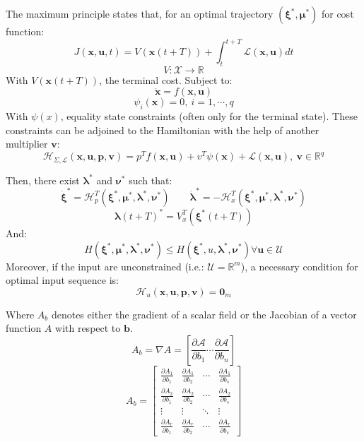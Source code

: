 \documentclass[a4paper, 12pt]{report}
\begin{document}
The maximum principle states that, for an optimal trajectory $(\boldsymbol{\xi}^*, \boldsymbol{\mu}^*)$ for cost function:
\[ J(\boldsymbol{x}, \boldsymbol{u}, t) = V(\boldsymbol{x}(t+T))  + \int_t^{t+T} \mathcal{L}(\boldsymbol{x}, \boldsymbol{u})dt\]
\[ V: \mathcal{X} \rightarrow \mathbb{R} \]
With $ V(\boldsymbol{x}(t+T))$, the terminal cost. Subject to:
\[ \boldsymbol{\dot x} = f(\boldsymbol{x}, \boldsymbol{u}) \]
\[ \psi_i(\boldsymbol{x}) = 0,\ i = 1, \cdots, q \]
With $\psi(x)$, equality state constraints (often only for the terminal state). These constraints can be adjoined to the Hamiltonian with the help of another multiplier $\boldsymbol{v}$:
\[ \mathcal{H}_{\Sigma,\mathcal{L}}(\boldsymbol{x}, \boldsymbol{u}, \boldsymbol{p}, \boldsymbol{v}) = p^T f(\boldsymbol{x}, \boldsymbol{u}) + v^T\psi(\boldsymbol{x}) + \mathcal{L}(\boldsymbol{x}, \boldsymbol{u}),\ \boldsymbol{v} \in \mathbb{R}^q \]

Then, there exist $\boldsymbol{\lambda}^*$ and $\boldsymbol{\nu}^*$ such that:
\[ \boldsymbol{\dot \xi}^* = \mathcal{H}_p^T (\boldsymbol{\xi}^*, \boldsymbol{\mu}^*, \boldsymbol{\lambda}^*, \boldsymbol{\nu}^*)  \qquad \boldsymbol{\dot \lambda}^*  = -\mathcal{H}_x^T (\boldsymbol{\xi}^*, \boldsymbol{\mu}^*, \boldsymbol{\lambda}^*, \boldsymbol{\nu}^*)\]
\[ \boldsymbol{\lambda}(t+T)^* = V_x^T(\boldsymbol{\xi}^*(t+T)) \]
And:
\[ H(\boldsymbol{\xi}^*, \boldsymbol{\mu}^*, \boldsymbol{\lambda}^*, \boldsymbol{\nu}^*) \leq H(\boldsymbol{\xi}^*, u, \boldsymbol{\lambda}^*, \boldsymbol{\nu}^*) \forall \boldsymbol{u} \in \mathcal{U} \]
Moreover, if the input are unconstrained (i.e.: $\mathcal{U}=\mathbb{R}^m$), a necessary condition for optimal input sequence is:
\[ \mathcal{H}_u (\boldsymbol{x}, \boldsymbol{u}, \boldsymbol{p}, \boldsymbol{v}) = \boldsymbol{0}_m \]

Where $A_b$ denotes either the gradient of a scalar field or the Jacobian of a vector function $A$ with respect to $\boldsymbol{b}$.
\[ A_b = \nabla A = \left [ \frac{\partial \mathcal{A}}{\partial b_1} \cdots \frac{\partial \mathcal{A}}{\partial b_n} \right ] \]
\[ A_b =  \begin{bmatrix} \frac{\partial A_1}{\partial b_1} & \frac{\partial A_1}{\partial b_2} & \cdots & \frac{\partial A_1}{\partial b_s}  \\ 
 \frac{\partial A_2}{\partial b_1} &  \frac{\partial A_2}{\partial b_2} & \cdots & \frac{\partial A_2}{\partial b_s}  \\ 
 \vdots &  \vdots & \ddots & \vdots  \\ 
 \frac{\partial A_r}{\partial b_1} &  \frac{\partial A_r}{\partial b_2} & \cdots & \frac{\partial A_r}{\partial b_s} \end{bmatrix}  \]
 
\end{document}
